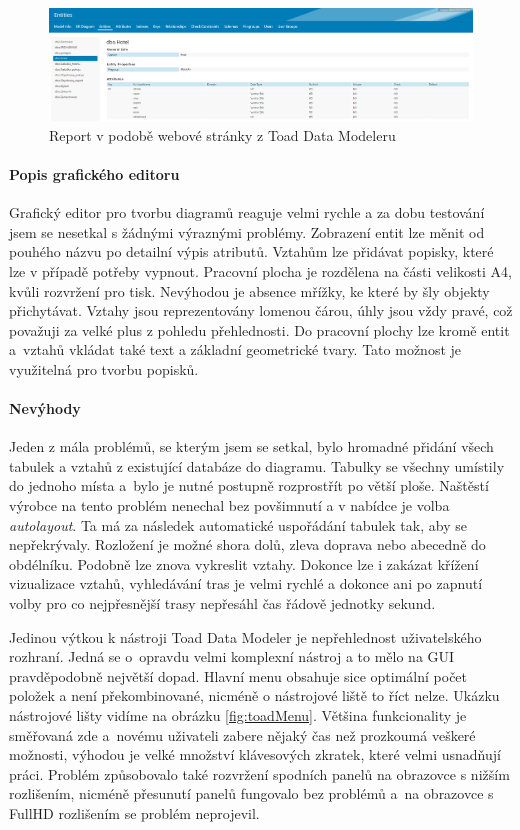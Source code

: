 \documentclass[czech,bachelor,public,dept460,male,oneside]{diploma}
\begin{document}
		\begin{figure}[!h]
			\centering
			\includegraphics[width=1\textwidth]{Figures/EditorToadReport}
			\caption[Report v podobě webové stránky z Toad Data Modeleru]{Report v podobě webové stránky z Toad Data Modeleru}
			\label{fig:toadReport}
		\end{figure}
		
		\paragraph{Popis grafického editoru}
		Grafický editor pro tvorbu diagramů reaguje velmi rychle a za dobu testování jsem se nesetkal s žádnými výraznými problémy. Zobrazení entit lze měnit od  pouhého názvu po detailní výpis atributů. Vztahům lze přidávat popisky, které lze v případě potřeby vypnout. Pracovní plocha je rozdělena na části velikosti A4, kvůli rozvržení pro tisk. Nevýhodou je absence mřížky, ke které by šly objekty přichytávat. Vztahy jsou reprezentovány lomenou čárou, úhly jsou vždy pravé, což považuji za velké plus z pohledu přehlednosti. Do pracovní plochy lze kromě entit a~vztahů vkládat také text a základní geometrické tvary. Tato možnost je využitelná pro tvorbu popisků.
		
		\paragraph{Nevýhody}
		Jeden z mála problémů, se kterým jsem se setkal, bylo hromadné přidání všech tabulek a vztahů z existující databáze do diagramu. Tabulky se všechny umístily do jednoho místa a~bylo je nutné postupně rozprostřít po větší ploše. Naštěstí výrobce na tento problém nenechal bez povšimnutí a v nabídce je volba \textit{autolayout}. Ta má za následek automatické uspořádání tabulek tak, aby se nepřekrývaly. Rozložení je možné shora dolů, zleva doprava nebo abecedně do obdélníku. Podobně lze znova vykreslit vztahy. Dokonce lze i zakázat křížení vizualizace vztahů, vyhledávání tras je velmi rychlé a dokonce ani po zapnutí volby pro co nejpřesnější trasy nepřesáhl čas řádově jednotky sekund. 
		
		Jedinou výtkou k nástroji Toad Data Modeler je nepřehlednost uživatelského rozhraní. Jedná se o~opravdu velmi komplexní nástroj a to mělo na GUI pravděpodobně největší dopad. Hlavní menu obsahuje sice optimální počet položek a není překombinované, nicméně o nástrojové liště to říct nelze. Ukázku nástrojové lišty vidíme na obrázku \ref{fig:toadMenu}. Většina funkcionality je směřovaná zde a~novému uživateli zabere nějaký čas než prozkoumá veškeré možnosti, výhodou je velké množství klávesových zkratek, které velmi usnadňují práci. Problém způsobovalo také rozvržení spodních panelů na obrazovce s nižším rozlišením, nicméně přesunutí panelů fungovalo bez problémů a~na obrazovce s FullHD rozlišením se problém neprojevil.
		
\end{document}
